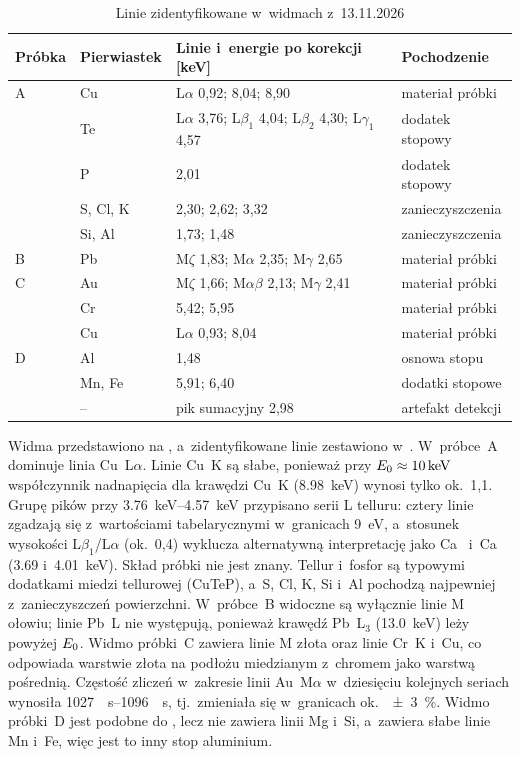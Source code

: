 \begin{table}[htbp]\centering\small
  \caption{Linie zidentyfikowane w~widmach z~13.11.2026}\label{tab:widma-probki}
  \begin{tabular}{@{}llll@{}}\toprule
    Próbka & Pierwiastek & Linie i~energie po korekcji [\si{\kilo\electronvolt}] & Pochodzenie \\\midrule
    A & Cu       & L$\alpha$ 0,92; \Ka{} 8,04; \Kb{} 8,90 & materiał próbki \\
      & Te       & L$\alpha$ 3,76; L$\beta_1$ 4,04; L$\beta_2$ 4,30; L$\gamma_1$ 4,57 & dodatek stopowy \\
      & P        & \Ka{} 2,01 & dodatek stopowy \\
      & S, Cl, K & \Ka{} 2,30; 2,62; 3,32 & zanieczyszczenia \\
      & Si, Al   & \Ka{} 1,73; 1,48 & zanieczyszczenia \\\midrule
    B & Pb       & M$\zeta$ 1,83; M$\alpha$ 2,35; M$\gamma$ 2,65 & materiał próbki \\\midrule
    C & Au       & M$\zeta$ 1,66; M$\alpha\beta$ 2,13; M$\gamma$ 2,41 & materiał próbki \\
      & Cr       & \Ka{} 5,42; \Kb{} 5,95 & materiał próbki \\
      & Cu       & L$\alpha$ 0,93; \Ka{} 8,04 & materiał próbki \\\midrule
    D & Al       & \Ka{} 1,48 & osnowa stopu \\
      & Mn, Fe   & \Ka{} 5,91; 6,40 & dodatki stopowe \\
      & --       & pik sumacyjny 2,98 & artefakt detekcji \\\bottomrule
  \end{tabular}
\end{table}

Widma przedstawiono na , a~zidentyfikowane linie
zestawiono w~. W~próbce~A dominuje linia Cu~L$\alpha$.
Linie Cu~K są słabe, ponieważ przy $E_0\approx\SI{10}{\kilo\electronvolt}$
współczynnik nadnapięcia dla krawędzi Cu~K (\SI{8.98}{\kilo\electronvolt})
wynosi tylko ok.~1,1. Grupę pików przy \SIrange{3.76}{4.57}{\kilo\electronvolt}
przypisano serii L telluru: cztery linie zgadzają się z~wartościami tabelarycznymi
w~granicach \SI{9}{\electronvolt}, a~stosunek wysokości L$\beta_1$/L$\alpha$
(ok.~0,4) wyklucza alternatywną interpretację jako Ca~\Ka{} i~Ca~\Kb{}
(\SI{3.69}{} i~\SI{4.01}{\kilo\electronvolt}). Skład próbki nie jest znany. Tellur i~fosfor są typowymi
dodatkami miedzi tellurowej (CuTeP), a~S, Cl, K, Si i~Al pochodzą najpewniej
z~zanieczyszczeń powierzchni.
W~próbce~B widoczne są wyłącznie linie M ołowiu; linie Pb~L nie występują,
ponieważ krawędź Pb~L$_3$ (\SI{13.0}{\kilo\electronvolt}) leży powyżej $E_0$.
Widmo próbki~C zawiera linie M złota oraz linie Cr~K i~Cu, co odpowiada
warstwie złota na podłożu miedzianym z~chromem jako warstwą pośrednią.
Częstość zliczeń w~zakresie linii Au~M$\alpha$ w~dziesięciu kolejnych seriach
wynosiła \SIrange{1027}{1096}{\per\second}, tj.~zmieniała się w~granicach
ok.~\SI{\pm3}{\percent}. Widmo próbki~D jest podobne do ,
lecz nie zawiera linii Mg i~Si, a~zawiera słabe linie Mn i~Fe, więc jest to
inny stop aluminium.

